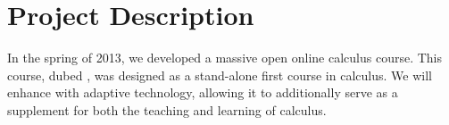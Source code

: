 \section{Project Description}



In the spring of 2013, we developed a massive open online calculus
course. This course, dubed \mooculus, was designed as a stand-alone
first course in calculus.  We will enhance \mooculus with adaptive
technology, allowing it to additionally serve as a supplement for both
the teaching and learning of calculus.






